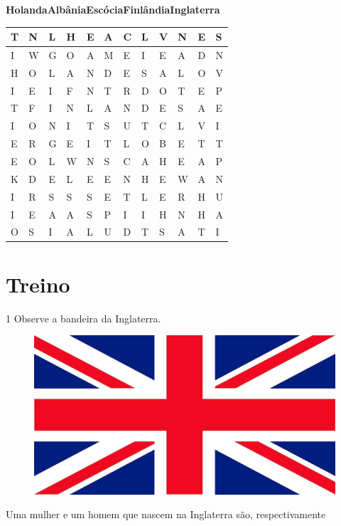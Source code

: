 \begin{mdframed}[linewidth=2pt,linecolor=salmao,roundcorner=10pt]
\textbf{Holanda}\hfill \textbf{Albânia}\hfill \textbf{Escócia}\hfill \textbf{Finlândia}\hfill \textbf{Inglaterra}

\end{mdframed}
\begin{minipage}{.5\textwidth}
\begin{longtable}[]{@{}llllllllllll@{}}
\toprule
T & N & L & H & E & A & C & L & V & N & E & S\tabularnewline
\midrule
\endhead
I & W & G & O & A & M & E & I & E & A & D & N\tabularnewline
H & O & L & A & N & D & E & S & A & L & O & V\tabularnewline
I & E & I & F & N & T & R & D & O & T & E & P\tabularnewline
T & F & I & N & L & A & N & D & E & S & A & E\tabularnewline
I & O & N & I & T & S & U & T & C & L & V & I\tabularnewline
E & R & G & E & I & T & L & O & B & E & T & T\tabularnewline
E & O & L & W & N & S & C & A & H & E & A & P\tabularnewline
K & D & E & L & E & E & N & H & E & W & A & N\tabularnewline
I & R & S & S & S & E & T & L & E & R & H & U\tabularnewline
I & E & A & A & S & P & I & I & H & N & H & A\tabularnewline
O & S & I & A & L & U & D & T & S & A & T & I\tabularnewline
\bottomrule
\end{longtable}
\end{minipage}\hspace{3cm}
\begin{minipage}{.3\textwidth}
\end{minipage}

\section*{Treino}

\num{1} Observe a bandeira da Inglaterra. %

\begin{figure}[htpb!]
\centering
\includegraphics[width=.5\textwidth]{media/image6.jpeg}
\end{figure}

Uma mulher e um homem que nascem na Inglaterra são, respectivamente

